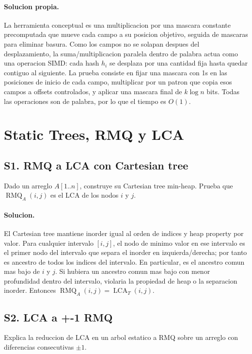 \documentclass[10pt]{article}
\newcommand{\bigO}{O}
\newcommand{\RMQ}{\operatorname{RMQ}}
\newcommand{\LCA}{\operatorname{LCA}}
\begin{document}
\paragraph{Solucion propia.}
La herramienta conceptual es una multiplicacion por una mascara constante
precomputada que mueve cada campo a su posicion objetivo, seguida de mascaras
para eliminar basura. Como los campos no se solapan despues del desplazamiento,
la suma/multiplicacion paralela dentro de palabra actua como una operacion SIMD:
cada hash $h_i$ se desplaza por una cantidad fija hasta quedar contiguo al
siguiente. La prueba consiste en fijar una mascara con 1s en las posiciones de
inicio de cada campo, multiplicar por un patron que copia esos campos a offsets
controlados, y aplicar una mascara final de $k\log n$ bits. Todas las operaciones
son de palabra, por lo que el tiempo es $\bigO(1)$.

\section{Static Trees, RMQ y LCA}

\subsection*{S1. RMQ a LCA con Cartesian tree}
Dado un arreglo $A[1..n]$, construye su Cartesian tree min-heap. Prueba que
$\RMQ_A(i,j)$ es el LCA de los nodos $i$ y $j$.

\paragraph{Solucion.}
El Cartesian tree mantiene inorder igual al orden de indices y heap property por
valor. Para cualquier intervalo $[i,j]$, el nodo de minimo valor en ese intervalo
es el primer nodo del intervalo que separa el inorder en izquierda/derecha; por
tanto es ancestro de todos los indices del intervalo. En particular, es el
ancestro comun mas bajo de $i$ y $j$. Si hubiera un ancestro comun mas bajo con
menor profundidad dentro del intervalo, violaria la propiedad de heap o la
separacion inorder. Entonces $\RMQ_A(i,j)=\LCA_T(i,j)$.

\subsection*{S2. LCA a +-1 RMQ}
Explica la reduccion de LCA en un arbol estatico a RMQ sobre un arreglo con
diferencias consecutivas $\pm 1$.
\end{document}
